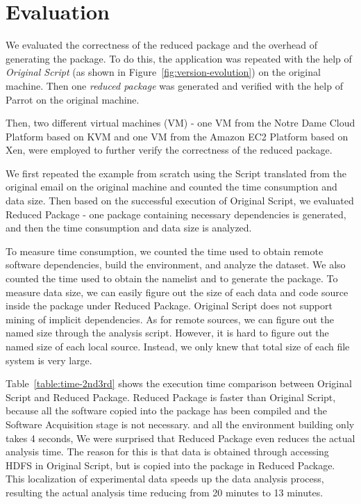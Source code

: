 \section{Evaluation}

We evaluated the correctness of the reduced package and the overhead of generating the package.
To do this, the application was repeated with the help of \emph{Original Script} (as shown in Figure~\ref{fig:version-evolution}) on the original machine. 
Then one \emph{reduced package} was generated and verified with the help of Parrot on the original machine.

Then, two different virtual machines (VM) - one VM from the Notre Dame Cloud Platform based on KVM and one VM from the Amazon EC2 Platform based on Xen, were employed to further verify the correctness of the reduced package.

We first repeated the example from scratch using the Script translated from the original email on the original machine and counted the time consumption and data size. 
Then based on the successful execution of Original Script, we evaluated Reduced Package - one package containing necessary dependencies is generated, and then the time consumption and data size is analyzed. 

To measure time consumption, we counted the time used to obtain remote software dependencies, build the environment, and analyze the dataset. We also counted the time used to obtain the namelist and to generate the package. To measure data size, we can easily figure out the size of each data and code source inside the package under Reduced Package.
Original Script does not support mining of implicit dependencies. As for remote sources, we can figure out the named size through the analysis script. However, it is hard to figure out the named size of each local source. 
Instead, we only knew that total size of each file system is very large.

Table~\ref{table:time-2nd3rd} shows the execution time comparison between
Original Script and Reduced Package.
Reduced Package is faster than Original Script, because all the software copied into the package has been compiled and the Software Acquisition stage is not necessary.
and all the environment building only takes 4 seconds,
We were surprised that Reduced Package even reduces the actual analysis time. 
The reason for this is that data is obtained through accessing HDFS in Original Script, but is copied into the package in Reduced Package. This localization of experimental data speeds up the data analysis process, resulting the actual analysis time reducing from 20 minutes to 13 minutes.

